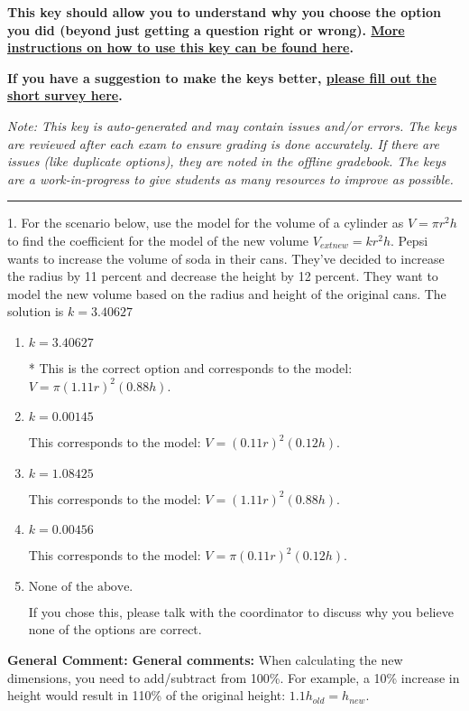 \documentclass{extbook}[14pt]
\begin{document}
\textbf{This key should allow you to understand why you choose the option you did (beyond just getting a question right or wrong). \href{https://xronos.clas.ufl.edu/mac1105spring2020/courseDescriptionAndMisc/Exams/LearningFromResults}{More instructions on how to use this key can be found here}.}

\textbf{If you have a suggestion to make the keys better, \href{https://forms.gle/CZkbZmPbC9XALEE88}{please fill out the short survey here}.}

\textit{Note: This key is auto-generated and may contain issues and/or errors. The keys are reviewed after each exam to ensure grading is done accurately. If there are issues (like duplicate options), they are noted in the offline gradebook. The keys are a work-in-progress to give students as many resources to improve as possible.}

\rule{\textwidth}{0.4pt}

1. For the scenario below, use the model for the volume of a cylinder as $V = \pi r^2 h$ to find the coefficient for the model of the new volume $V_{	ext{new}} = k r^2 h$.
Pepsi wants to increase the volume of soda in their cans. They've decided to increase the radius by 11 percent and decrease the height by 12 percent. They want to model the new volume based on the radius and height of the original cans. 
The solution is $ k = 3.40627 $ 

\begin{enumerate}[label=\Alph*.] 
\item $ k = 3.40627 $ 

 * This is the correct option and corresponds to the model: $V = \pi (1.11 r)^2 (0.88 h)$. 
\item $ k = 0.00145 $ 

 This corresponds to the model: $V = (0.11 r)^2 (0.12 h)$. 
\item $ k = 1.08425 $ 

 This corresponds to the model: $V = (1.11 r)^2 (0.88 h)$. 
\item $ k = 0.00456 $ 

 This corresponds to the model: $V = \pi (0.11 r)^2 (0.12 h)$. 
\item $ \text{None of the above.} $ 

 If you chose this, please talk with the coordinator to discuss why you believe none of the options are correct. 
\end{enumerate} 
 
\textbf{General Comment:} \textbf{General comments:} When calculating the new dimensions, you need to add/subtract from 100\%. For example, a 10\% increase in height would result in 110\% of the original height: $1.1h_{old} = h_{new}$. 
\end{document}
